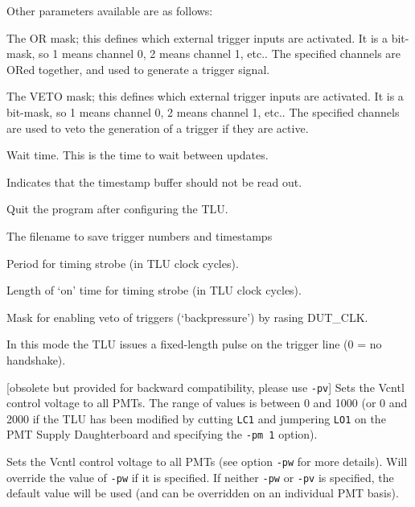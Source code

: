 Other parameters available are as follows:

\begin{description}
The OR mask; this defines which external trigger inputs are activated. It is a bit-mask, so 1
means channel 0, 2 means channel 1, etc.. The specified channels are ORed together, and used to
generate a trigger signal.

The VETO mask; this defines which external trigger inputs are activated. It is a bit-mask, so 1
means channel 0, 2 means channel 1, etc.. The specified channels are used to veto the generation
of a trigger if they are active.

Wait time. This is the time to wait between updates.

Indicates that the timestamp buffer should not be read out.

Quit the program after configuring the TLU.

     The filename to save trigger numbers and timestamps

Period for timing strobe (in \gls{TLU} clock cycles).

Length of `on' time for timing strobe (in \gls{TLU} clock cycles).

Mask for enabling veto of triggers (`backpressure') by rasing DUT\_CLK.

In this mode the TLU issues a fixed-length pulse on the trigger line (0 = no handshake).

[obsolete but provided for backward compatibility, please use \texttt{-pv}] Sets the Vcntl control
voltage to all PMTs. The range of values is between 0 and 1000 (or 0 and 2000 if the \gls{TLU} has
been modified by cutting \texttt{LC1} and jumpering \texttt{LO1} on the PMT Supply Daughterboard and
specifying the \texttt{-pm 1} option).

Sets the Vcntl control voltage to all PMTs (see option \texttt{-pw} for more details). Will override
the value of \texttt{-pw} if it is specified. If neither \texttt{-pw} or \texttt{-pv} is specified,
the default value will be used (and can be overridden on an individual PMT basis).


\end{description}
